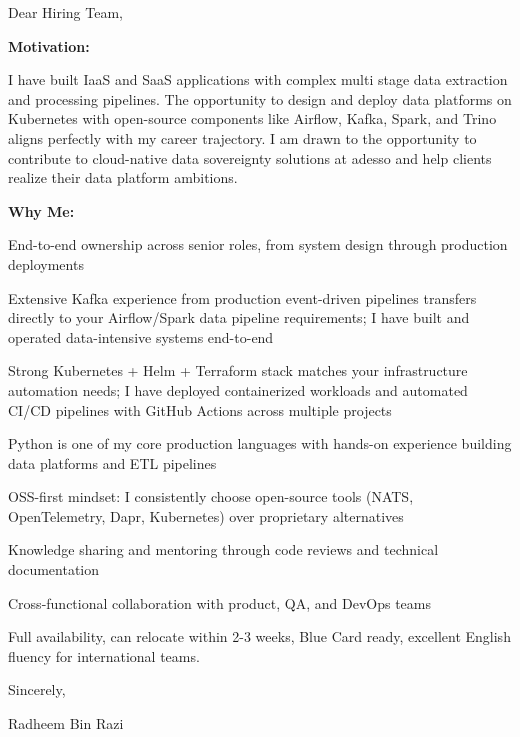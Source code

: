 \documentclass[11pt,a4paper]{coverletter}
\begin{document}

\opening{Dear Hiring Team,}

\textbf{Motivation:}

I have built IaaS and SaaS applications with complex multi stage data extraction and processing pipelines. The opportunity to design and deploy data platforms on Kubernetes with open-source components like Airflow, Kafka, Spark, and Trino aligns perfectly with my career trajectory. I am drawn to the opportunity to contribute to cloud-native data sovereignty solutions at adesso and help clients realize their data platform ambitions.

\textbf{Why Me:}

\bullets

  \item End-to-end ownership across senior roles, from system design through production deployments

  \item Extensive Kafka experience from production event-driven pipelines transfers directly to your Airflow/Spark data pipeline requirements; I have built and operated data-intensive systems end-to-end

  \item Strong Kubernetes + Helm + Terraform stack matches your infrastructure automation needs; I have deployed containerized workloads and automated CI/CD pipelines with GitHub Actions across multiple projects

  \item Python is one of my core production languages with hands-on experience building data platforms and ETL pipelines

  \item OSS-first mindset: I consistently choose open-source tools (NATS, OpenTelemetry, Dapr, Kubernetes) over proprietary alternatives

  \item Knowledge sharing and mentoring through code reviews and technical documentation

  \item Cross-functional collaboration with product, QA, and DevOps teams

\bulletsend

Full availability, can relocate within 2-3 weeks, Blue Card ready, excellent English fluency for international teams.

\closing{Sincerely,}{Radheem Bin Razi}
\end{document}
